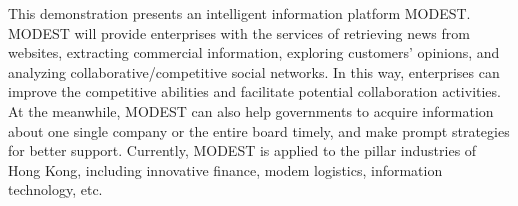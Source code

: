 This demonstration presents an intelligent information platform MODEST. MODEST will provide enterprises with the services of retrieving news from websites, extracting commercial information, exploring customers' opinions, and analyzing collaborative/competitive social networks. In this way, enterprises can improve the competitive abilities and facilitate potential collaboration activities. At the meanwhile, MODEST can also help governments to acquire information about one single company or the entire board timely, and make prompt strategies for better support. Currently, MODEST is applied to the pillar industries of Hong Kong, including innovative finance, modem logistics, information technology, etc.
